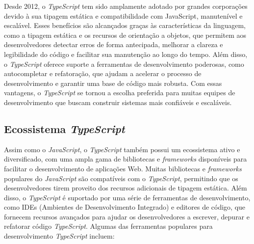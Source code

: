 Desde 2012, o \textit{TypeScript} tem sido amplamente adotado por grandes corporações devido à sua tipagem estática e compatibilidade com JavaScript, manutenível e escalável. Esses benefícios são alcançados graças às características da linguagem, como a tipagem estática e os recursos de orientação a objetos, que permitem aos desenvolvedores detectar erros de forma antecipada, melhorar a clareza e legibilidade do código e facilitar sua manutenção ao longo do tempo. Além disso, o \textit{TypeScript} oferece suporte a ferramentas de desenvolvimento poderosas, como autocompletar e refatoração, que ajudam a acelerar o processo de desenvolvimento e garantir uma base de código mais robusta. Com essas vantagens, o \textit{TypeScript} se tornou a escolha preferida para muitas equipes de desenvolvimento que buscam construir sistemas mais confiáveis e escaláveis.

\subsection{Ecossistema \textit{TypeScript}}

Assim como o \textit{JavaScript}, o \textit{TypeScript} também possui um ecossistema ativo e diversificado, com uma ampla gama de bibliotecas e \textit{frameworks} disponíveis para facilitar o desenvolvimento de aplicações Web. Muitas bibliotecas e \textit{frameworks} populares do \textit{JavaScript} são compatíveis com o \textit{TypeScript}, permitindo que os desenvolvedores tirem proveito dos recursos adicionais de tipagem estática. Além disso, o \textit{TypeScript} é suportado por uma série de ferramentas de desenvolvimento, como IDEs (Ambientes de Desenvolvimento Integrado) e editores de código, que fornecem recursos avançados para ajudar os desenvolvedores a escrever, depurar e refatorar código \textit{TypeScript}. Algumas das ferramentas populares para desenvolvimento \textit{TypeScript} incluem:

